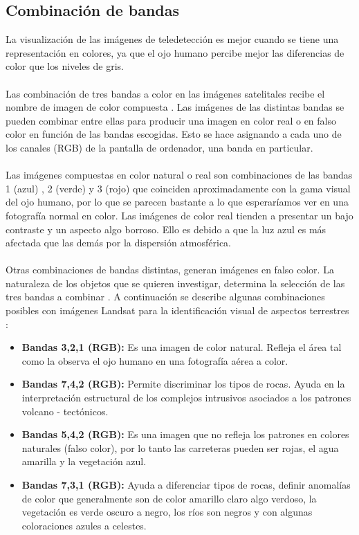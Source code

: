 \subsection{Combinaci\'on de bandas}
La visualizaci\'on de las im\'agenes de teledetecci\'on es mejor cuando se tiene una representaci\'on en colores, ya que el ojo humano percibe mejor las diferencias de color que los niveles de gris.\\~\\
Las combinaci\'on de tres bandas a color en las im\'agenes satelitales recibe el nombre de imagen de color compuesta \cite{com2015color}. Las im\'agenes de las distintas bandas se pueden combinar entre ellas para producir una imagen en color real o en falso color en funci\'on de las bandas escogidas. Esto se hace asignando a cada uno de los canales (RGB) de la pantalla de ordenador, una banda en particular.\\~\\
Las im\'agenes compuestas en color natural o real son combinaciones de las bandas 1 (azul) , 2 (verde) y 3 (rojo) que coinciden aproximadamente con la gama visual del ojo humano, por lo que se parecen bastante a lo que esperar\'iamos ver en una fotograf\'ia normal en color. Las im\'agenes de color real tienden a presentar un bajo contraste y un aspecto algo borroso. Ello es debido a que la luz azul es m\'as afectada que las dem\'as por la dispersi\'on atmosf\'erica.\\~\\
Otras combinaciones de bandas distintas, generan im\'agenes en falso color. La naturaleza de los objetos que se quieren investigar, determina la selecci\'on de las tres bandas a combinar \cite{com2015color}. A continuaci\'on se describe algunas combinaciones posibles con im\'agenes Landsat para la identificaci\'on visual de aspectos terrestres \cite{lillesand2014remote}:
	\begin{itemize}
		\item \textbf{Bandas 3,2,1 (RGB):} Es una imagen de color natural. Refleja el \'area tal como la observa el ojo humano en una fotograf\'ia a\'erea a color.
		\item  \textbf{Bandas 7,4,2 (RGB):} Permite discriminar los tipos de rocas. Ayuda en la interpretaci\'on estructural de los complejos intrusivos asociados a los patrones volcano - tect\'onicos.
		\item  \textbf{Bandas 5,4,2 (RGB):} Es una imagen que no refleja los patrones en colores naturales (falso color), por lo tanto las carreteras pueden ser rojas, el agua amarilla y la vegetaci\'on azul.
		\item \textbf{Bandas 7,3,1 (RGB):} Ayuda a diferenciar tipos de rocas, definir anomal\'ias de color que generalmente son de color amarillo claro algo verdoso, la vegetaci\'on es verde oscuro a negro, los r\'ios son negros y con algunas coloraciones azules a celestes.		
	\end{itemize}
